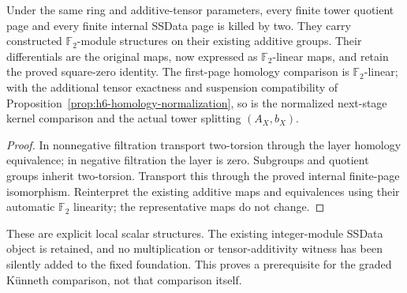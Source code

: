 \begin{proposition}
  \label{prop:h6-derived-mod2-pages}
  \leanok
  Under the same ring and additive-tensor parameters, every finite tower
  quotient page and every finite internal SSData page is killed by two.
  They carry constructed $\mathbb F_2$-module structures on their existing
  additive groups. Their differentials are the original maps, now expressed
  as $\mathbb F_2$-linear maps, and retain the proved square-zero identity.
  The first-page homology comparison is $\mathbb F_2$-linear; with the
  additional tensor exactness and suspension compatibility of
  Proposition~\ref{prop:h6-homology-normalization}, so is the normalized
  next-stage kernel comparison and the actual tower splitting $(A_X,b_X)$.
\end{proposition}
\begin{proof}
  In nonnegative filtration transport two-torsion through the layer
  homology equivalence; in negative filtration the layer is zero.
  Subgroups and quotient groups inherit two-torsion. Transport this
  through the proved internal finite-page isomorphism. Reinterpret the
  existing additive maps and equivalences using their automatic
  $\mathbb F_2$ linearity; the representative maps do not change.
  \leanok
\end{proof}

These are explicit local scalar structures. The existing integer-module
SSData object is retained, and no multiplication or tensor-additivity
witness has been silently added to the fixed foundation. This proves a
prerequisite for the graded K\"unneth comparison, not that comparison itself.

